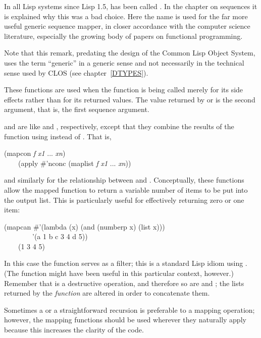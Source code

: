 \begin{defun}[Function]
\beforenoterule
\begin{incompatibility}
In all Lisp systems since Lisp 1.5,
 has been called .  In the chapter on sequences
it is explained why this was a bad choice.  Here the name 
is used for the far more useful generic sequence mapper,
in closer accordance with the computer science literature,
especially the growing body of papers on functional programming.
\begin{new}
Note that this remark, predating the design of the Common Lisp Object System,
uses the term ``generic'' in a generic sense and not necessarily
in the technical sense used by CLOS
(see chapter~\ref{DTYPES}).
\end{new}
\end{incompatibility}
\afternoterule

These functions are used when the function is being called merely for its
side effects rather than for its returned values.
The value returned by  or  is the second argument,
that is, the first sequence argument.

 and  are like  and , respectively,
except that they combine the results of
the function using  instead of .  That is,
\begin{lisp}
(mapcon {\it f} {\it x1} ... {\it xn}) \\
~~~\EQ\ (apply \#'nconc (maplist {\it f} {\it x1} ... {\it xn}))
\end{lisp}
and similarly for the relationship between  and .
Conceptually, these functions allow the mapped function to return
a variable number of items to be put into the output list.
This is particularly useful for effectively returning zero or one item:
\begin{lisp}
(mapcan \#'(lambda (x) (and (numberp x) (list x))) \\
~~~~~~~~'(a 1 b c 3 4 d 5)) \\
~~~\EV\ (1 3 4 5)
\end{lisp}
In this case the function serves as a filter; this is a standard Lisp
idiom using .
(The function  might have been useful in this
particular context, however.)
Remember that  is a destructive operation, and therefore
so are  and ; the lists returned by the {\it function}
are altered in order to concatenate them.

Sometimes a  or a straightforward recursion is preferable to a
mapping operation;  however, the mapping functions should be used wherever they
naturally apply because this increases the clarity of the code. 


\end{defun}
